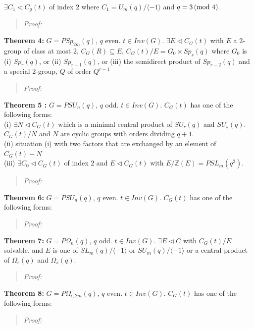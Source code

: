 $\exists C_1 \lhd C_g(t)$ of index $2$ where $C_1 = U_m(q)/\langle -1 \rangle$ and
$q=3 \thinspace \textnormal{(mod } 4 \textnormal{)}$.
\begin{quote}
\emph{Proof:} 
\end{quote}
{\bf Theorem 4:}
$G= PSp_{2m}(q)$, $q$ even. $t \in Inv(G)$.  $ \exists E \lhd C_G(t)$ with $E$ a $2$-group of
class at most $2$, $C_G(R) \subseteq E$, $C_G(t)/E = G_0 \times Sp_s(q)$ where $G_0$ is (i)
$Sp_r(q)$, or (ii) $Sp_{r-1}(q)$, or (iii) the semidirect product of $Sp_{r-2}(q)$ and a special
$2$-group, $Q$ of order $Q^{r-1}$
\begin{quote}
\emph{Proof:} 
\end{quote}
{\bf Theorem 5 :}
$G= PSU_{n}(q)$, $q$ odd. $t \in Inv(G)$.  $C_G(t)$ has one of the following forms:
\\ (i) $\exists N \lhd C_G(t)$ which is a minimal central product of $SU_r(q)$ and $SU_s(q)$.
$C_G(t)/N$ and $N$ are cyclic groups with orders dividing $q+1$.
\\ (ii) situation (i) with two factors that are exchanged by an element of $C_G(t) -N$
\\ (iii) $\exists C_0 \lhd C_G(t)$ of index $2$ and $E \lhd C_G(t)$ with $E/{\mathbb Z}(E)= PSL_m(q^2)$.
\begin{quote}
\emph{Proof:} 
\end{quote}
{\bf Theorem 6:}
$G= PSU_{n}(q)$, $q$ even. $t \in Inv(G)$.  $C_G(t)$ has one of the following forms:
\begin{quote}
\emph{Proof:} 
\end{quote}
{\bf Theorem 7:}
$G= P\Omega_{n}(q)$, $q$ odd. $t \in Inv(G)$.  $\exists E \lhd C$ with $C_G(t)/E$ solvable.
and $E$ is one of 
$SL_m(q)/\langle -1 \rangle$ or
$SU_m(q)/\langle -1 \rangle$ or a central product of $\Omega_r(q)$ and  $\Omega_s(q)$.
\begin{quote}
\emph{Proof:} 
\end{quote}
{\bf Theorem 8:}
$G= P\Omega_{\epsilon, 2m}(q)$, $q$ even. $t \in Inv(G)$.  $C_G(t)$ has one of the following forms:
\begin{quote}
\emph{Proof:} 
\end{quote}
